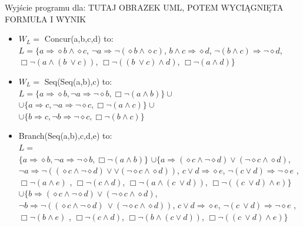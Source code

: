 \documentclass[a4paper, 11pt]{article}
\begin{document}
	Wyjście programu dla:
	TUTAJ OBRAZEK UML, POTEM WYCIĄGNIĘTA FORMUŁA I WYNIK
	\begin{itemize}
	\item $W_L= $ Concur(a,b,c,d) to:\\
	$L= \{ a   \Rightarrow     \diamond b   \wedge    \diamond c $,
		$	  \neg a   \Rightarrow     \neg (  \diamond b   \wedge    \diamond c)$,
			$ b   \wedge   c    \Rightarrow    \diamond d$,
			$  \neg (b   \wedge   c)    \Rightarrow     \neg   \diamond d$,
			$  \Box   \neg (a   \wedge   (b \  \vee   c))$,
			$  \Box   \neg ((b \  \vee   c)   \wedge   d)$,
			$  \Box   \neg (a   \wedge   d)\}$
	
	\item 	$W_L=$ Seq(Seq(a,b),c) to: \\
	$ L=\{  a \Rightarrow \diamond b , \neg a\Rightarrow \neg \diamond b, \Box \neg (a \wedge  b)\} \cup $ \\
	$ \cup \{ a \Rightarrow c , \neg a\Rightarrow \neg \diamond c, \Box\neg (a \wedge  c)\} \cup $\\
	$ \cup \{ b \Rightarrow c , \neg b\Rightarrow \neg \diamond c, \Box \neg (b \wedge  c)\} $
	
	\item Branch(Seq(a,b),c,d,e) to:\\
	$ L=$\\$ \{  a \Rightarrow \diamond b , \neg a\Rightarrow \neg \diamond b, \Box \neg (a \wedge  b)\} $ 
	$\cup 	\{	  a    \Rightarrow    ( \diamond c   \wedge    \neg   \diamond d)   \vee   ( \neg   \diamond c   \wedge    \diamond d)$,
			  $ \neg a    \Rightarrow     \neg (( \diamond c   \wedge    \neg   \diamond d)  \vee  \vee ( \neg   \diamond c   \wedge    \diamond d))$,
			 $ c  \vee d    \Rightarrow     \diamond e $,
			  $ \neg (c  \vee   d)    \Rightarrow    \neg   \diamond e$ ,
			   $\Box   \neg (a   \wedge   e)$ ,
			   $\Box   \neg (c   \wedge   d)$,
			   $\Box   \neg (a   \wedge   (c \  \vee   d))$,
			   $\Box   \neg ((c \  \vee   d)   \wedge   e)\} $			  
	$\cup 	\{	  b    \Rightarrow    ( \diamond c   \wedge    \neg   \diamond d)   \vee   ( \neg   \diamond c   \wedge    \diamond d)$,
			  $ \neg b    \Rightarrow     \neg (( \diamond c   \wedge    \neg   \diamond d) \  \vee   ( \neg   \diamond c   \wedge    \diamond d))$,
			 $ c  \vee   d    \Rightarrow     \diamond e $,
			  $ \neg (c \  \vee   d)    \Rightarrow    \neg   \diamond e$ ,
			   $\Box   \neg (b   \wedge   e)$ ,
			   $\Box   \neg (c   \wedge   d)$,
			   $\Box   \neg (b   \wedge   (c   \vee   d))$,
			   $\Box   \neg ((c \  \vee   d)   \wedge   e)\}$
			 		   		
	\end{itemize}
\end{document}
